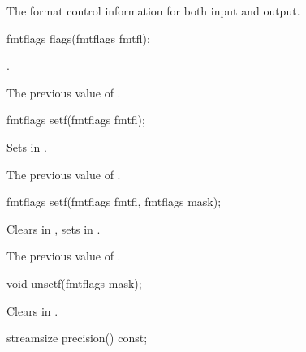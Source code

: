 \begin{itemdescr}
\pnum
\returns
The format control information for both input and output.
\end{itemdescr}

%
%
\begin{itemdecl}
fmtflags flags(fmtflags fmtfl);
\end{itemdecl}

\begin{itemdescr}
\pnum
\postcondition
{}.

\pnum
\returns
The previous value of
.
\end{itemdescr}

%
\begin{itemdecl}
fmtflags setf(fmtflags fmtfl);
\end{itemdecl}

\begin{itemdescr}
\pnum
\effects
Sets  in
.

\pnum
\returns
The previous value of
.
\end{itemdescr}

%
%
\begin{itemdecl}
fmtflags setf(fmtflags fmtfl, fmtflags mask);
\end{itemdecl}

\begin{itemdescr}
\pnum
\effects
Clears  in
,
sets
in
.

\pnum
\returns
The previous value of
.
\end{itemdescr}

%
\begin{itemdecl}
void unsetf(fmtflags mask);
\end{itemdecl}

\begin{itemdescr}
\pnum
\effects
Clears  in
.
\end{itemdescr}

%
\begin{itemdecl}
streamsize precision() const;
\end{itemdecl}

